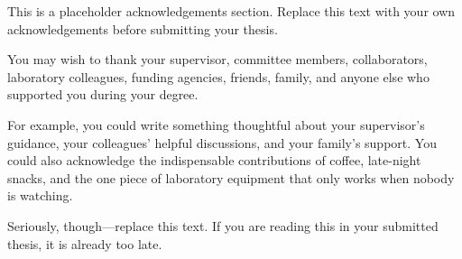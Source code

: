 This is a placeholder acknowledgements section. Replace this text with your own acknowledgements before submitting your thesis.

You may wish to thank your supervisor, committee members, collaborators, laboratory colleagues, funding agencies, friends, family, and anyone else who supported you during your degree.

For example, you could write something thoughtful about your supervisor's guidance, your colleagues' helpful discussions, and your family's support. You could also acknowledge the indispensable contributions of coffee, late-night snacks, and the one piece of laboratory equipment that only works when nobody is watching.

Seriously, though—replace this text. If you are reading this in your submitted thesis, it is already too late.



